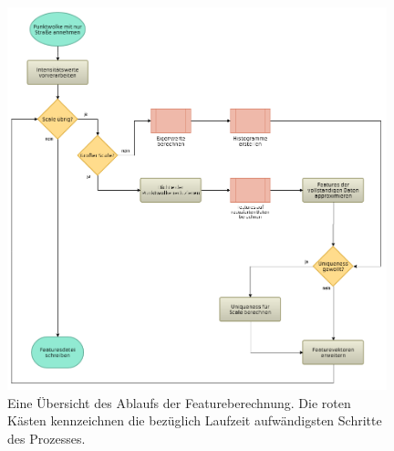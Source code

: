 \begin{figure}[!ht]
    \centering
    \includegraphics[width=0.98\textwidth]{graphics/flowchart_feature_extraction}
    \caption{Eine Übersicht des Ablaufs der Featureberechnung. Die roten Kästen kennzeichnen die bezüglich Laufzeit aufwändigsten Schritte des Prozesses.}
    \label{fig:feature_extraction}
\end{figure}